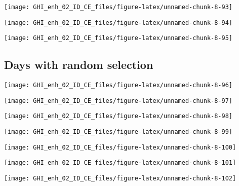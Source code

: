 \documentclass[
  10pt,
  a4paper,oneside]{article}
\begin{document}
\begin{center}\texttt{[image: GHI\_enh\_02\_ID\_CE\_files/figure-latex/unnamed-chunk-8-93]} \end{center}

\begin{center}\texttt{[image: GHI\_enh\_02\_ID\_CE\_files/figure-latex/unnamed-chunk-8-94]} \end{center}

\begin{center}\texttt{[image: GHI\_enh\_02\_ID\_CE\_files/figure-latex/unnamed-chunk-8-95]} \end{center}

\FloatBarrier

\hypertarget{days-with-random-selection}{%
\subsection{Days with random selection}\label{days-with-random-selection}}

\begin{center}\texttt{[image: GHI\_enh\_02\_ID\_CE\_files/figure-latex/unnamed-chunk-8-96]} \end{center}

\begin{center}\texttt{[image: GHI\_enh\_02\_ID\_CE\_files/figure-latex/unnamed-chunk-8-97]} \end{center}

\begin{center}\texttt{[image: GHI\_enh\_02\_ID\_CE\_files/figure-latex/unnamed-chunk-8-98]} \end{center}

\begin{center}\texttt{[image: GHI\_enh\_02\_ID\_CE\_files/figure-latex/unnamed-chunk-8-99]} \end{center}

\begin{center}\texttt{[image: GHI\_enh\_02\_ID\_CE\_files/figure-latex/unnamed-chunk-8-100]} \end{center}

\begin{center}\texttt{[image: GHI\_enh\_02\_ID\_CE\_files/figure-latex/unnamed-chunk-8-101]} \end{center}

\begin{center}\texttt{[image: GHI\_enh\_02\_ID\_CE\_files/figure-latex/unnamed-chunk-8-102]} \end{center}
\end{document}
